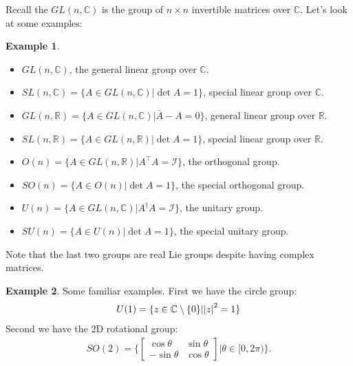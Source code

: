 \documentclass{book}
\theoremstyle{definition}
\newtheorem{exmp}{Example}[section]
\newcommand{\R}{\mathbb{R}}
\newcommand{\C}{\mathbb{C}}
\newcommand{\Id}{\mathcal{I}}
\begin{document}
Recall the $GL(n,\C)$ is the group of  $n\times n$ invertible matrices over $\C$. Let's look at some examples:

\begin{exmp}
	$\,$
	\begin{itemize}
		\item $GL(n,\mathbb{C})$, the general linear group over $\mathbb{C}$.
		
		\item $SL(n,\mathbb{C}) = \{ A \in GL(n,\mathbb{C}) \vert \det{A} = 1 \}$, special linear group over $\C$. 
		
		\item $GL(n,\R) = \{ A\in GL(n,\C) \vert \bar{A} - A = 0 \}$, general linear group over $\R$. 
		
		\item $SL(n,\mathbb{R}) = \{ A \in GL(n,\mathbb{R}) \vert \det{A} = 1 \}$, special linear group over $\R$. 
		
		\item $O(n) = \{ A\in GL(n,\R) \vert A^\top A = \Id \}$, the orthogonal group.
		
		\item $SO(n) = \{ A\in O(n) \vert \det{A} = 1 \}$, the special orthogonal group.
		
		\item $U(n) = \{ A\in GL(n,\C) \vert A^\dagger A = \Id\}$, the unitary group.
		
		\item $SU(n) = \{ A \in U(n)\vert  \det{A} = 1   \}$, the special unitary group.  
	\end{itemize}

	Note that the last two groups are real Lie groups despite having complex matrices. 
\end{exmp}

\begin{exmp}
	Some familiar examples. First we have the circle group:
	\begin{align}
	U(1) = \{  z\in \C\setminus\{ 0 \} \vert \abs{z}^2 = 1   \}
	\end{align}
	Second we have the 2D rotational group:
	\begin{align}
	SO(2) = \{ \begin{bmatrix}
	\cos\theta & \sin\theta \\ -\sin\theta & \cos\theta
	\end{bmatrix} \bigg\vert \theta \in [ 0,2\pi) \}.
	\end{align}
\end{exmp}
\end{document}
